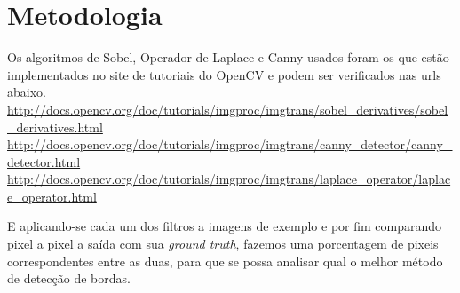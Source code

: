 \documentclass[conference,harvard,brazil,english]{sbatex}
\begin{document}
	\section{Metodologia}
		Os algoritmos de Sobel, Operador de Laplace e Canny usados foram os que estão implementados no site de tutoriais do OpenCV e podem ser verificados nas urls abaixo.\newline\newline
		\url{http://docs.opencv.org/doc/tutorials/imgproc/imgtrans/sobel_derivatives/sobel_derivatives.html}\newline
		\url{http://docs.opencv.org/doc/tutorials/imgproc/imgtrans/canny_detector/canny_detector.html}\newline
		\url{http://docs.opencv.org/doc/tutorials/imgproc/imgtrans/laplace_operator/laplace_operator.html}\newline
		
		\par E aplicando-se cada um dos filtros a imagens de exemplo e por fim comparando pixel a pixel a saída com sua \textit{ground truth}, fazemos uma porcentagem de pixeis correspondentes entre as duas, para que se possa analisar qual o melhor método de detecção de bordas.
		
\end{document}
